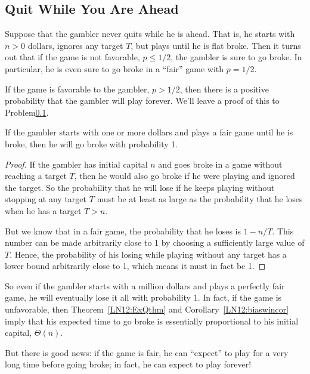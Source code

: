 \begin{staffnotes}

\subsection{Quit While You Are Ahead}

Suppose that the gambler never quits while he is ahead.  That is, he
starts with $n>0$ dollars, ignores any target $T$, but plays until he is
flat broke.  Then it turns out that if the game is not favorable, \ie $p
\leq 1/2$, the gambler is sure to go broke.  In particular, he is even
sure to go broke in a ``fair'' game with $p = 1/2$.

If the game is favorable to the gambler, \ie $p>1/2$, then there is a
positive probability that the gambler will play forever.  We'll leave a
proof of this to Problem\ref{}.

\begin{lemma}\label{LN12:go broke}
If the gambler starts with one or more dollars and plays a fair game until
he is broke, then he will go broke with probability 1.
\end{lemma}

\begin{proof}
If the gambler has initial capital $n$ and goes broke in a game without
reaching a target $T$, then he would also go broke if he were playing and
ignored the target.  So the probability that he will lose if he keeps
playing without stopping at any target $T$ must be at least as large as the
probability that he loses when he has a target $T>n$.

But we know that in a fair game, the probability that he loses is $1 -
n/T$.  This number can be made arbitrarily close to 1 by choosing a
sufficiently large value of $T$.  Hence, the probability of his losing
while playing without any target has a lower bound arbitrarily close to 1,
which means it must in fact be 1.
\end{proof}

So even if the gambler starts with a million dollars and plays a perfectly
fair game, he will eventually lose it all with probability 1.  In fact, if
the game is unfavorable, then Theorem~\ref{LN12:ExQthm} and
Corollary~\ref{LN12:biaswincor} imply that his expected time to go broke is
essentially proportional to his initial capital, \ie $\Theta(n)$.

But there is good news: if the game is fair, he can ``expect'' to play for
a very long time before going broke; in fact, he can expect to play
forever!


\end{staffnotes}
